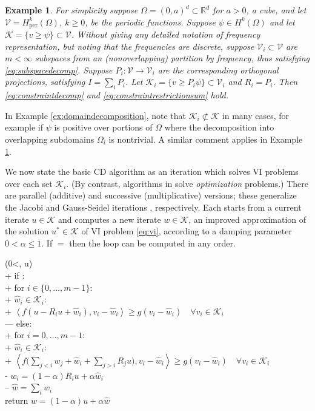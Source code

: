 \documentclass[letterpaper,final,12pt,reqno]{amsart}
\theoremstyle{cstyle}
\theoremstyle{cstyle*}
\theoremstyle{dstyle}
\newtheorem{example}[theorem]{Example}
\numberwithin{equation}{section}
\numberwithin{figure}{section}
\numberwithin{table}{section}
\numberwithin{theorem}{section}
\newcommand{\RR}{\mathbb{R}}
\newcommand{\cK}{\mathcal{K}}
\newcommand{\cV}{\mathcal{V}}
\newcommand{\ip}[2]{\left<#1,#2\right>}
\begin{document}
\begin{example}  \label{ex:frequencydecomposition}  For simplicity suppose $\Omega = (0,a)^d \subset \RR^d$ for $a>0$, a cube, and let $\cV = H_{\text{per}}^k(\Omega)$, $k\ge 0$, be the periodic functions.  Suppose $\psi \in H^k(\Omega)$ and let $\cK = \{v \ge \psi\} \subset \cV$.  Without giving any detailed notation of frequency representation, but noting that the frequencies are discrete, suppose $\cV_i \subset \cV$ are $m<\infty$ subspaces from an (nonoverlapping) partition by frequency, thus satisfying \eqref{eq:subspacedecomp}.  Suppose $P_i:\cV \to \cV_i$ are the corresponding orthogonal projections, satisfying $I = \sum_i P_i$.  Let $\cK_i = \{v \ge P_i \psi\} \subset \cV_i$ and $R_i = P_i$.  Then \eqref{eq:constraintdecomp} and \eqref{eq:constraintrestrictionsum} hold.
\end{example}

In Example \ref{ex:domaindecomposition}, note that $\cK_i \not\subset \cK$ in many cases, for example if $\psi$ is positive over portions of $\Omega$ where the decomposition into overlapping subdomains $\Omega_i$ is nontrivial.  A similar comment applies in Example \ref{ex:frequencydecomposition}.

We now state the basic CD algorithm as an iteration which solves VI problems over each set $\cK_i$.  (By contrast, algorithms in \cite{Tai2003} solve \emph{optimization} problems.)  There are parallel (additive) and successive (multiplicative) versions; these generalize the Jacobi and Gauss-Seidel iterations \cite{Greenbaum1997}, respectively.  Each starts from a current iterate $u \in \cK$ and computes a new iterate $w\in\cK$, an improved approximation of the solution $u^* \in \cK$ of VI problem \eqref{eq:vi}, according to a damping parameter $0<\alpha\le 1$.  If  $=$  then the  loop can be computed in any order.

\begin{pseudo*}
(0<\alpha{}, u\in\cK)\text{:} \\+
    if : \\+
        for $i \in \{0,\dots,m-1\}$: \\+
            $\hat w_i\in \cK_i$: \\+
                 $\boxed{\ip{f(u - R_i u + \hat w_i)}{v_i-\hat w_i} \ge g(v_i-\hat w_i)} \quad \forall v_i\in \cK_i$ \\---
    else: \\+
        for $i = 0,\dots,m-1$: \\+
            $\hat w_i\in \cK_i$: \\+
                $\displaystyle \boxed{\ip{f\Big(\sum_{j<i} w_j + \hat w_i + \sum_{j>i} R_j u\Big)}{v_i-\hat w_i} \ge g(v_i-\hat w_i)} \quad \forall v_i\in \cK_i$ \\-
            $w_i = (1-\alpha) R_i u + \alpha \hat w_i$ \\--
    $\hat w = \sum_i \hat w_i$ \\
    return $w=(1-\alpha) u + \alpha \hat w$
\end{pseudo*}
\end{document}
